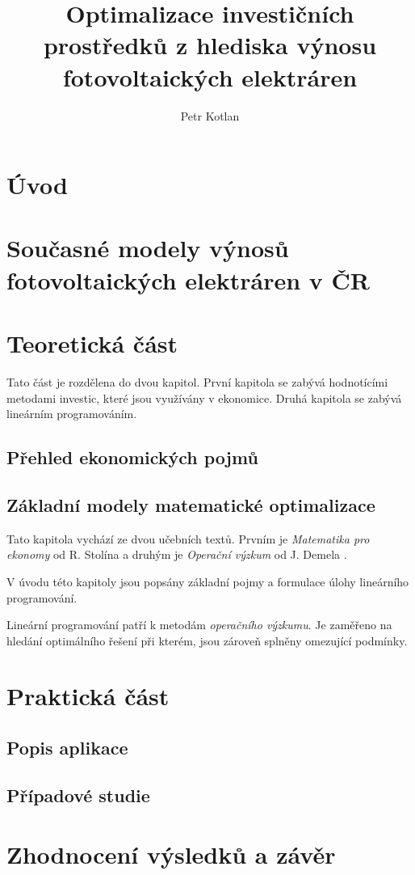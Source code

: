 \documentclass[a4paper, 12pt]{report}
\author{Petr Kotlan}
\title{Optimalizace investičních prostředků z hlediska výnosu fotovoltaických elektráren}
\date{}
\begin{document}



\tableofcontents

\chapter*{Úvod}

\chapter{Současné modely výnosů fotovoltaických elektráren v ČR}

\chapter{Teoretická část}

Tato část je rozdělena do dvou kapitol. První kapitola se zabývá hodnotícími metodami investic, které jsou využívány v ekonomice.
Druhá kapitola se zabývá lineárním programováním.

\section{Přehled ekonomických pojmů}


\section{Základní modely matematické optimalizace}
Tato kapitola vychází ze dvou učebních textů. Prvním je \textit{Matematika pro ekonomy} od R. Stolína \cite{matematika_pro_ekonomy} a druhým je \textit{Operační výzkum} od J. Demela \cite{demel}.


V úvodu této kapitoly jsou popsány základní pojmy a formulace úlohy lineárního programování.

Lineární programování patří k metodám \textit{operačního výzkumu}.
Je zaměřeno na hledání optimálního řešení při kterém, jsou zároveň splněny omezující podmínky.




\chapter{Praktická část}

\section{Popis aplikace}



\section{Případové studie}

\chapter{Zhodnocení výsledků a závěr}



\end{document}
